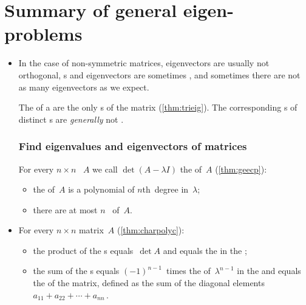 
\section{Summary of general eigen-problems}
\label{sec:sumevg}

\begin{itemize}
\def\index#1{}%

\item In the case of non-symmetric matrices, eigenvectors are usually not orthogonal, s and eigenvectors are sometimes , and sometimes there are not as many eigenvectors as we expect.

\itemme The  of a  are the only s of the matrix (\autoref{thm:trieig}).  
The corresponding s of distinct s are \emph{generally} not .





\subsubsection*{Find eigenvalues and eigenvectors of matrices}

\itemme For every \(n\times n\) ~\(A\) we call \(\det(A-\lambda I)\) the  of~\(A\) (\autoref{thm:geecp}):
\begin{itemize}
\item the  of~\(A\) is a polynomial of \(n\)th~degree in~\(\lambda\);
\item  there are at most \(n\)~ of~\(A\).
\end{itemize}

\item For every \(n\times n\) matrix~\(A\) (\autoref{thm:charpolyc}): \begin{itemize}
\item the product of the s equals~\(\det A\) and equals the  in the ;  
\item the sum of the s equals \((-1)^{n-1}\)~times the  of~\(\lambda^{n-1}\) in the  and equals the  of the matrix, defined as the sum of the diagonal elements \(a_{11}+a_{22}+\cdots+a_{nn}\)\,.
\end{itemize}


\end{itemize}
